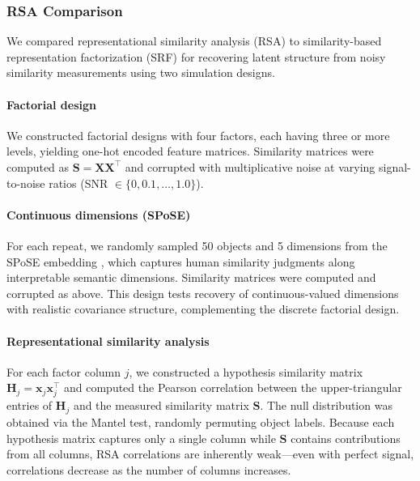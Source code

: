 \subsubsection{RSA Comparison}
\label{sec:exp-rsa}

We compared representational similarity analysis (RSA) to similarity-based representation factorization (SRF) for recovering latent structure from noisy similarity measurements using two simulation designs.

\paragraph{Factorial design}
We constructed factorial designs with four factors, each having three or more levels, yielding one-hot encoded feature matrices. Similarity matrices were computed as $\mathbf{S} = \mathbf{X}\mathbf{X}^\top$ and corrupted with multiplicative noise at varying signal-to-noise ratios (SNR $\in \{0, 0.1, \ldots, 1.0\}$).

\paragraph{Continuous dimensions (SPoSE)}
For each repeat, we randomly sampled 50 objects and 5 dimensions from the SPoSE embedding \citep{hebart2020revealing}, which captures human similarity judgments along interpretable semantic dimensions. Similarity matrices were computed and corrupted as above. This design tests recovery of continuous-valued dimensions with realistic covariance structure, complementing the discrete factorial design.

\paragraph{Representational similarity analysis}
For each factor column $j$, we constructed a hypothesis similarity matrix $\mathbf{H}_j = \mathbf{x}_j \mathbf{x}_j^\top$ and computed the Pearson correlation between the upper-triangular entries of $\mathbf{H}_j$ and the measured similarity matrix $\mathbf{S}$. The null distribution was obtained via the Mantel test, randomly permuting object labels. Because each hypothesis matrix captures only a single column while $\mathbf{S}$ contains contributions from all columns, RSA correlations are inherently weak---even with perfect signal, correlations decrease as the number of columns increases.

